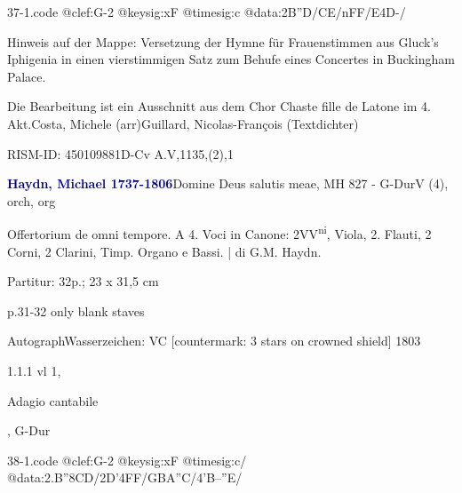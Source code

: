 \documentclass[a4paper, twocolumn, 11pt]{book}
\begin{document}
\begin{filecontents*}{37-1.code}
@clef:G-2
@keysig:xF
@timesig:c
@data:2B''D/CE/nFF/E4D-/
\end{filecontents*}
\newline %
\par Hinweis auf der Mappe: Versetzung der Hymne für Frauenstimmen aus Gluck’s Iphigenia in einen vierstimmigen Satz zum Behufe eines Concertes in Buckingham Palace.
\par Die Bearbeitung ist ein Ausschnitt aus dem Chor {\textquotedbl}Chaste fille de Latone{\textquotedbl} im 4. Akt.\newline Costa, Michele  (arr)\newline Guillard, Nicolas-François  (Textdichter)
\par RISM-ID: 450109881\newline D-Cv  A.V,1135,(2),1
\par \vspace{16pt} \textcolor{darkblue}{\textbf{Haydn, Michael  1737-1806}}\hfillplus{[38]}\newline Domine Deus salutis meae, MH 827 - G-Dur\newline V (4), orch, org
\par \begin{itshape} Offertorium de omni tempore. A 4. Voci in Canone: 2VV\textsuperscript{n}\textsuperscript{i}, Viola, 2. Flauti, 2 Corni, 2 Clarini, Timp. Organo e Bassi. | di G.M. Haydn.\end{itshape} 
\par \textcolor{darkblue}{}  Partitur: 32p.; 23 x 31,5 cm\newline \begin{small} p.31-32 only blank staves\end{small} \newline Autograph\newline Wasserzeichen: VC [countermark: 3 stars on crowned shield]  1803
\par 1.1.1  vl 1, \begin{itshape}Adagio cantabile\end{itshape}, G-Dur  
\begin{filecontents*}{38-1.code}
@clef:G-2
@keysig:xF
@timesig:c/
@data:2.B''{8CD}/2D'4FF/GBA''C/4'B--''E/
\end{filecontents*}
\end{document}
